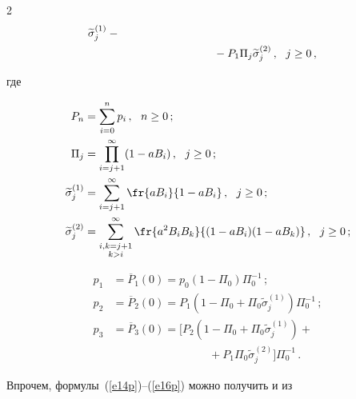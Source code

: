 \begin{multicols}{2}
\begin{align}
\widetilde \sigma_j^{(1)} -{}\notag\\


&\hspace*{50pt}\ \ \ \ \ \ \ \ \ \ {}- P_1 \Pi_{j} \widetilde \sigma_j^{(2)}\,,


\ \ j\ge 0\,, \label{e16p}


\end{align}


где


\begin{align*}


P_n & = \sum_{i=0}^n p_i\,, \ \ n\ge 0\,;\\


\Pi_j & = \prod_{i=j+1}^\infty (1 - a B_{i})\,, \ \ j\ge 0\,;\\


\widetilde \sigma_j^{(1)} & = \sum_{i=j+1}^\infty \fr{aB_i }{ 1 - aB_i}\,,


\ \ j\ge 0\,;\\


\widetilde \sigma_j^{(2)} & =


\sum^\infty_{\substack{{i,k=j+1}\\{k>i}}}


\fr{a^2 B_i B_k }{ (1 - aB_i)(1-aB_k)}\,,


\ \ j\ge 0\,;


\end{align*}


\begin{align*}


p_{1} & = \overline P_1(0) = p_0 (1 - \Pi_0) \Pi_0^{-1}\,;\\


p_{2} & = \overline P_2(0) = P_1 \left ( 1 - \Pi_0 +


\Pi_0 \widetilde \sigma_j^{(1)}\right ) \Pi_0^{-1}\,;\\


p_{3} & = \overline P_3(0) = \bigg [


P_2 \left ( 1 - \Pi_0 + \Pi_0 \widetilde \sigma_j^{(1)}\right ) +{}\\


&\ \ \ \ \ \ \ \ \ \ \ \ \ \ \ \ \ \ \ \ \ \ \ \ \ \ \ \ \ \ \ \ \ \ \ \ \ \ \ {}+P_1 \Pi_0 \widetilde \sigma_j^{(2)}


\bigg ]


\Pi_0^{-1}\,.


\end{align*}


Впрочем, формулы~(\ref{e14p})--(\ref{e16p}) можно получить и из



\end{multicols}
